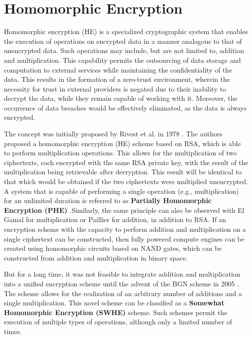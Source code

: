 \chapter{Homomorphic Encryption}

Homomorphic encryption (HE) is a specialized cryptographic system that enables the execution of operations on encrypted data in a manner analogous to that of unencrypted data. Such operations may include, but are not limited to, addition and multiplication. This capability permits the outsourcing of data storage and computation to external services while maintaining the confidentiality of the data. This results in the formation of a zero-trust environment, wherein the necessity for trust in external providers is negated due to their inability to decrypt the data, while they remain capable of working with it. Moreover, the occurrence of data breaches would be effectively eliminated, as the data is always encrypted.

The concept was initially proposed by Rivest et al. in 1978 \cite{Rivest1978}. The authors proposed a homomorphic encryption (HE) scheme based on RSA, which is able to perform multiplication operations. This allows for the multiplication of two ciphertexts, each encrypted with the same RSA private key, with the result of the multiplication being retrievable after decryption. This result will be identical to that which would be obtained if the two ciphertexts were multiplied unencrypted. A system that is capable of performing a single operation (e.g., multiplication) for an unlimited duration is referred to as \textbf{Partially Homomorphic Encryption (PHE)}  \cite{FheImplementations, SurveyOfHomomorphicEncryption}.Similarly, the same principle can also be observed with El Gamal for multiplication or Paillier for addition, in addition to RSA. If an encryption scheme with the capacity to perform addition and multiplication on a single ciphertext can be constructed, then fully powered compute engines can be created using homomorphic circuits based on NAND gates, which can be constructed from addition and multiplication in binary space.

But for a long time, it was not feasible to integrate addition and multiplication into a unified encryption scheme until the advent of the BGN scheme in 2005 \cite{BGN}. The scheme allows for the realization of an arbitrary number of additions and a single multiplication. This novel scheme can be classified as a  \textbf{Somewhat Homomorphic Encryption (SWHE)}  scheme. Such schemes permit the execution of multiple types of operations, although only a limited number of times.

